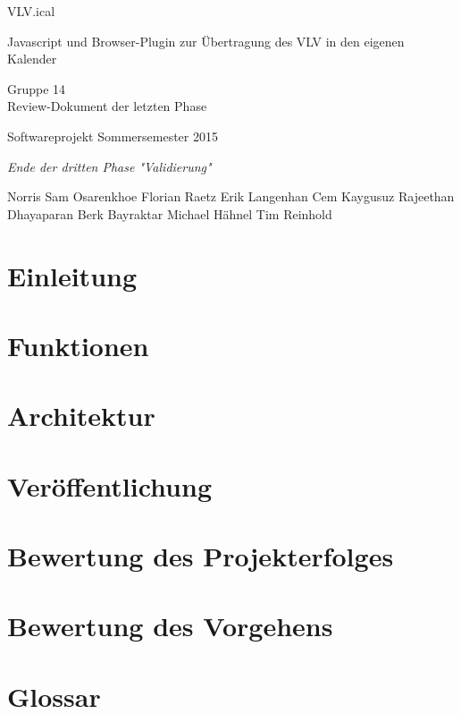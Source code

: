 \documentclass[11pt]{scrreprt}
\begin{document}
\begin{center}
\Huge
VLV.ical

\medskip
\large
Javascript und Browser-Plugin zur \"Ubertragung des VLV in den eigenen Kalender

\vskip 1in
\Large
Gruppe 14 \\
Review-Dokument der letzten Phase

\large
\vskip 2in
Softwareprojekt Sommersemester 2015

\medskip
\textit{
Ende der dritten Phase "Validierung"
}
\vskip 3in

\normalsize
\textup{ 
Norris Sam Osarenkhoe \qquad
Florian Raetz \qquad
}
\textup{ 
Erik Langenhan \qquad
Cem Kaygusuz \qquad
}
\textup{ 
Rajeethan Dhayaparan \qquad
Berk Bayraktar \qquad
}
\textup{ 
Michael H\"ahnel \qquad
Tim Reinhold
}
\end{center}

\newpage
\tableofcontents

\newpage
\chapter{Einleitung}
\chapter{Funktionen}
\chapter{Architektur}
\chapter{Veröffentlichung}
\chapter{Bewertung des Projekterfolges}
\chapter{Bewertung des Vorgehens}
\chapter{Glossar}
\end{document}
